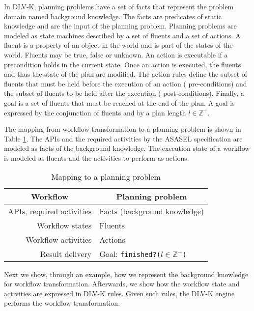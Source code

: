 In DLV-K, planning problems have a set of facts that represent the problem domain named background knowledge. The facts are predicates of static knowledge and are the input of the planning problem. Planning problems are modeled as state machines described by a set of fluents and a set of actions. A fluent is a property of an object in the world and is part of the states of the world. Fluents may be true, false or unknown. An action is executable if a precondition holds in the current state. Once an action is executed, the fluents and thus the state of the plan are modified. The action rules define the subset of fluents that must be held before the execution of an action (\ie{} pre-conditions) and the subset of fluents to be held after the execution (\ie{} post-conditions). Finally, a goal is a set of fluents that must be reached at the end of the plan. A goal is expressed by the conjunction of fluents and by a plan length $l \in \mathds{Z}^{+}$.

The mapping from workflow transformation to a planning problem is shown in Table \ref{tab:mappingQW-PP}. The APIs and the required activities by the ASASEL specification are modeled as facts of the background knowledge. The execution state of a workflow is modeled as fluents and the activities to perform as actions.

	\begin{table}
	   \begin{center}
	      \begin{tabular}{|r|l|}
	         \hline
	         \multicolumn{1}{|c|}{\textbf{Workflow }}& \multicolumn{1}{c|}{\textbf{Planning problem}} \\
	         \hline
	         APIs, required activities & Facts (background knowledge) \\
	         \hline
	         Workflow states & Fluents \\
	         \hline
	         Workflow activities & Actions \\
	         \hline
	         Result delivery & Goal: \texttt{finished?(}$l \in \mathds{Z}^{+}$\texttt{)} \\
	         \hline
	      \end{tabular}
	   \end{center} 
	   \caption{Mapping to a planning problem}
	   \label{tab:mappingQW-PP}
	\end{table}

Next we show, through an example, how we represent the background knowledge for workflow transformation. Afterwards, we show how the workflow state and activities are expressed in DLV-K rules. Given such rules, the DLV-K engine performs the workflow transformation.

